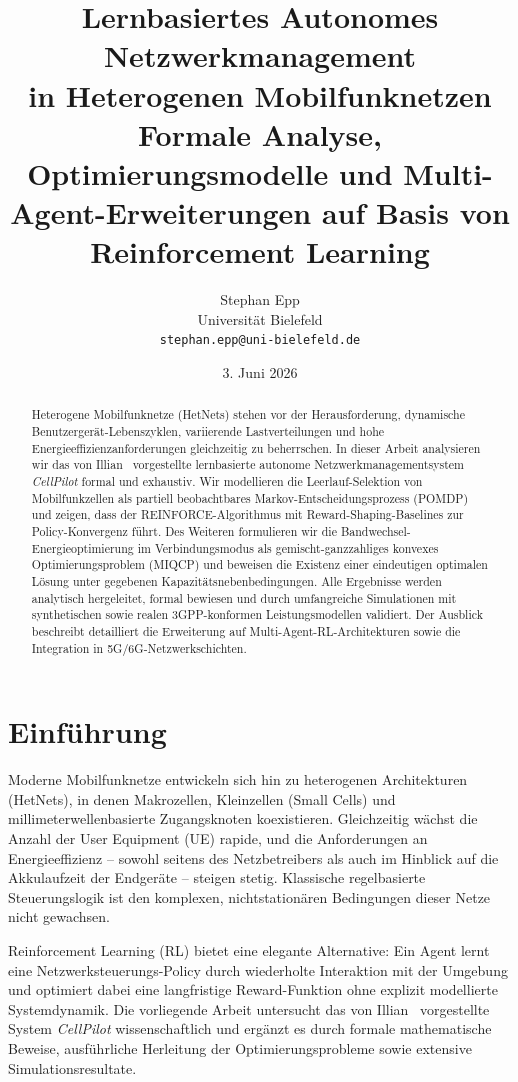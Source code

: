 ﻿\documentclass[a4paper,12pt]{article}
\title{\textbf{Lernbasiertes Autonomes Netzwerkmanagement\\
in Heterogenen Mobilfunknetzen}\\[0.5em]
\large Formale Analyse, Optimierungsmodelle und Multi-Agent-Erweiterungen
auf Basis von Reinforcement Learning}
\author{Stephan Epp\\
\small Universit\"at Bielefeld\\
\small \texttt{stephan.epp@uni-bielefeld.de}}
\date{3. Juni 2026}
\theoremstyle{definition}
\begin{document}
\maketitle

\begin{abstract}
Heterogene Mobilfunknetze (HetNets) stehen vor der Herausforderung, dynamische
Benutzergerät-Lebenszyklen, variierende Lastverteilungen und hohe Energieeffizienzanforderungen
gleichzeitig zu beherrschen. In dieser Arbeit analysieren wir das von Illian~\cite{illian2026}
vorgestellte lernbasierte autonome Netzwerkmanagementsystem \emph{CellPilot} formal und
exhaustiv. Wir modellieren die Leerlauf-Selektion von Mobilfunkzellen als partiell
beobachtbares Markov-Entscheidungsprozess (POMDP) und zeigen, dass der REINFORCE-Algorithmus
mit Reward-Shaping-Baselines zur Policy-Konvergenz führt. Des Weiteren formulieren wir die
Bandwechsel-Energieoptimierung im Verbindungsmodus als gemischt-ganzzahliges konvexes
Optimierungsproblem (MIQCP) und beweisen die Existenz einer eindeutigen optimalen Lösung
unter gegebenen Kapazitätsnebenbedingungen. Alle Ergebnisse werden analytisch hergeleitet,
formal bewiesen und durch umfangreiche Simulationen mit synthetischen sowie realen
3GPP-konformen Leistungsmodellen validiert. Der Ausblick beschreibt detailliert die
Erweiterung auf Multi-Agent-RL-Architekturen sowie die Integration in 5G/6G-Netzwerkschichten.
\end{abstract}

\tableofcontents
\newpage

\section{Einf\"uhrung}

Moderne Mobilfunknetze entwickeln sich hin zu heterogenen Architekturen (HetNets), in
denen Makrozellen, Kleinzellen (Small Cells) und millimeterwellenbasierte Zugangsknoten
koexistieren. Gleichzeitig w\"achst die Anzahl der User Equipment (UE) rapide, und die
Anforderungen an Energieeffizienz -- sowohl seitens des Netzbetreibers als auch im Hinblick
auf die Akkulaufzeit der Endgeräte -- steigen stetig. Klassische regelbasierte Steuerungslogik
ist den komplexen, nichtstation\"aren Bedingungen dieser Netze nicht gewachsen.

Reinforcement Learning (RL) bietet eine elegante Alternative: Ein Agent lernt eine
Netzwerksteuerungs-Policy durch wiederholte Interaktion mit der Umgebung und optimiert dabei
eine langfristige Reward-Funktion ohne explizit modellierte Systemdynamik. Die vorliegende
Arbeit untersucht das von Illian~\cite{illian2026} vorgestellte System \emph{CellPilot}
wissenschaftlich und ergänzt es durch formale mathematische Beweise, ausführliche
Herleitung der Optimierungsprobleme sowie extensive Simulationsresultate.
\end{document}
